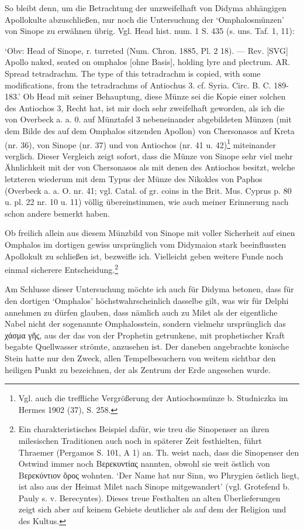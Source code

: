 \documentclass[a4paper, 11pt, oneside]{article}
\begin{document}
So bleibt denn, um die Betrachtung der unzweifelhaft von Didyma abhängigen Apollokulte abzuschließen, nur noch die Untersuchung der `Omphalosmünzen' von Sinope zu erwähnen übrig. Vgl. Head hist. num. 1 S. 435 (s. uns. Taf. 1, 11):

`Obv: Head of Sinope, r. turreted (Num. Chron. 1885, Pl. 2 18). --- Rev. [SVG] Apollo naked, seated on omphalos [ohne Basis], holding lyre and plectrum. AR. Spread tetradrachm. The type of this tetradrachm is copied, with some modifications, from the tetradrachms of Antiochus 3. cf. Syria. Circ. B. C. 189-183.' Ob Head mit seiner Behauptung, diese Münze sei die Kopie einer solchen des Antiochos 3, Recht hat, ist mir doch sehr zweifelhaft geworden, als ich die von Overbeck a. a. 0. auf Münztafel 3 nebeneinander abgebildeten Münzen (mit dem Bilde des auf dem Omphalos sitzenden Apollon) von Chersonasos auf Kreta (nr. 36), von Sinope (nr. 37) und von Antiochos (nr. 41 u. 42)\footnote{Vgl. auch die treffliche Vergrößerung der Antiochosmünze b. Studniczka im Hermes 1902 (37), S. 258.} miteinander verglich. Dieser Vergleich zeigt sofort, dass die Münze von Sinope sehr viel mehr Ähnlichkeit mit der von Chersonasos als mit denen des Antiochos besitzt, welche letzteren wiederum mit dem Typus der Münze des Nikokles von Paphos (Overbeck a. a. O. nr. 41; vgl. Catal. of gr. coins in the Brit. Mus. Cyprus p. 80 u. pl. 22 nr. 10 u. 11) völlig übereinstimmen, wie auch meiner Erinnerung nach schon andere bemerkt haben.

Ob freilich allein aus diesem Münzbild von Sinope mit voller Sicherheit auf einen Omphalos im dortigen gewiss ursprünglich vom Didymaion stark beeinflussten Apollokult zu schließen ist, bezweifle ich. Vielleicht geben weitere Funde noch einmal sicherere Entscheidung.\footnote{Ein charakteristisches Beispiel dafür, wie treu die Sinopenser an ihren milesischen Traditionen auch noch in späterer Zeit festhielten, führt Thraemer (Pergamos S. 101, A 1) an. Th. weist nach, dass die Sinopenser den Ostwind immer noch Βερεκυντίας nannten, obwohl sie weit östlich von Βερεκύντιον ὄρος wohnten. `Der Name hat nur Sinn, wo Phrygien östlich liegt, ist also aus der Heimat Milet nach Sinope mitgewandert' (vgl. Grotefend b. Pauly s. v. Berecyntes). Dieses treue Festhalten an alten Überlieferungen zeigt sich aber auf keinem Gebiete deutlicher als auf dem der Religion und des Kultus.}

Am Schlusse dieser Untersuchung möchte ich auch für Didyma betonen, dass für den dortigen `Omphalos' höchstwahrscheinlich dasselbe gilt, was wir für Delphi annehmen zu dürfen glauben, dass nämlich auch zu Milet als der eigentliche Nabel nicht der sogenannte Omphalosstein, sondern vielmehr ursprünglich das χάσμα γῆς, aus der das von der Prophetin getrunkene, mit prophetischer Kraft begabte Quellwasser strömte, anzusehen ist. Der daneben angebrachte konische Stein hatte nur den Zweck, allen Tempelbesuchern von weitem sichtbar den heiligen Punkt zu bezeichnen, der als Zentrum der Erde angesehen wurde.
\clearpage
\end{document}
